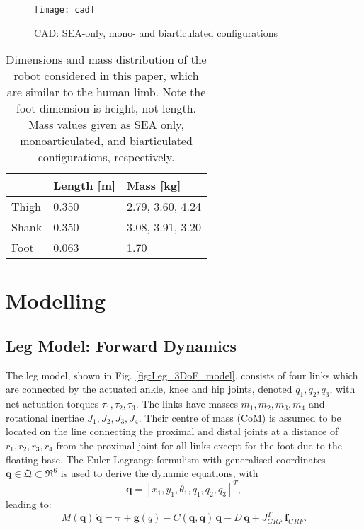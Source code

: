 \documentclass[letterpaper, 10 pt, conference]{ieeeconf}  %
\begin{document}
\begin{figure}[ht]
	\centering
	\texttt{[image: cad]}
	\caption{CAD: SEA-only, mono- and biarticulated configurations}
	\label{fig:configurations}
\end{figure}

\begin{table}
	\begin{tabular}{l|l|l}
		& \textbf{Length [m]} & \textbf{Mass [kg]} \\
		\hline
		Thigh & 0.350 & 2.79, 3.60, 4.24 \\
		Shank & 0.350 & 3.08, 3.91, 3.20 \\
		Foot & 0.063 & 1.70 \\
	\end{tabular}
	\caption{Dimensions and mass distribution of the robot considered in this paper, which are similar to the human limb. Note the foot dimension is height, not length. Mass values given as SEA only, monoarticulated, and biarticulated configurations, respectively.}
	\label{table:designParameters}
\end{table}

\section{Modelling} 
\label{sec:modelling}

\subsection{Leg Model: Forward Dynamics} 
The leg model, shown in Fig. \ref{fig:Leg_3DoF_model}, consists of four links which are connected by the actuated ankle, knee and hip joints, denoted $q_1,q_2,q_3$, with net actuation torques $\tau_1,\tau_2,\tau_3$. The links have masses $m_1,m_2,m_3,m_4$ and rotational inertiae $J_1,J_2,J_3,J_4$. Their centre of mass (CoM) is assumed to be located on the line connecting the proximal and distal joints at a distance of $r_1,r_2,r_3,r_4$ from the proximal joint for all links except for the foot due to the floating base. %
The Euler-Lagrange formulism with generalised coordinates $\mathbf{q} \in \mathfrak{Q} \subset \mathfrak{R}^{6}$ is used to derive the dynamic equations, with
\begin{equation}
	\mathbf{q} = [x_1,y_1,\theta_1,q_1,q_2,q_3]^T,
	\label{eq:q}
\end{equation}
leading to:
\begin{equation}
	M(\mathbf{q}) \, \mathbf{\ddot q} = \mathbf{\boldsymbol{\tau}} + \mathbf{g}(q) - C(\mathbf{q, \dot q}) \, \mathbf{\dot q} - D \, \mathbf{\dot q} + J_{GRF}^T \, \mathbf{f}_{GRF}.
\label{eq:fwddyn}
\end{equation}
\end{document}
